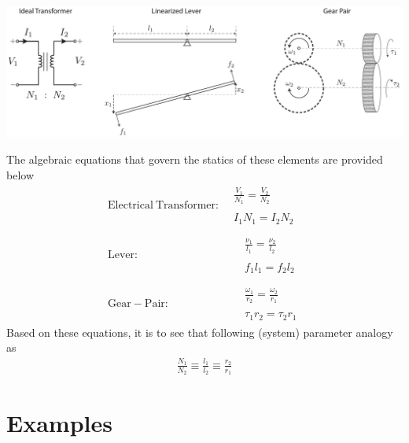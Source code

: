 \documentclass[twoside]{article}
\begin{document}
  \begin{minipage}[h]{1\linewidth}
    \begin{center}
      \includegraphics[width=1\textwidth]{trans}
    \end{center}
  \end{minipage}

The algebraic equations that govern the statics of these elements are provided below
%
%
\begin{align*}
\mathrm{Electrical} \ \mathrm{Transformer:}& \begin{array}{c} \frac{V_1}{N_1} =
                                    \frac{V_2}{N_2} \\ \\ I_1 N_1 = I_2 N_2 \end{array} 
\\ \\
\mathrm{Lever:}& \quad  \begin{array}{c} \frac{\nu_1}{l_1} =
                                    \frac{\nu_2}{l_2} \\ \\ f_1 l_1 = f_2 l_2 \end{array} 
\\ \\
\mathrm{Gear-Pair:}& \quad  \begin{array}{c} \frac{\omega_1}{r_2} =
                                    \frac{\omega_2}{r_1} \\ \\ \tau_1 r_2 = \tau_2 r_1 \end{array} 
\end{align*}
%
Based on these equations, it is to see that following (system) parameter
analogy as
%
\begin{align*}
\frac{N_1}{N_2} \equiv \frac{l_1}{l_2} \equiv \frac{r_2}{r_1} 
\end{align*}
%

\newpage

\section{Examples}
\end{document}
